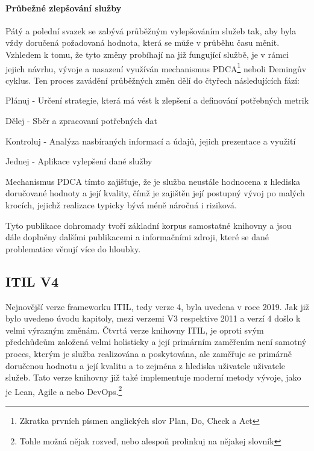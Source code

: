\documentclass[
  digital,     %
  twoside,     %
  lof,         %
  lot,         %
]{fithesis4}
\begin{document}
\paragraph{Průbežné zlepšování služby}
Pátý a polední svazek se zabývá průběžným vylepšováním služeb tak, aby byla vždy doručená požadovaná hodnota, která se může v průběhu času měnit. Vzhledem k tomu, že tyto změny probíhají na již fungující službě, je v rámci jejich návrhu, vývoje a nasazení využíván mechanismus PDCA\footnote{Zkratka prvních písmen anglických slov Plan, Do, Check a Act} neboli Demingův cyklus. Ten proces zavádění průběžných změn dělí do čtyřech následujících fází: \parencite[s.~38]{Matula2017}
\begin{compactitem}
    \item Plánuj - Určení strategie, která má vést k zlepšení a definování potřebných metrik
    \item Dělej - Sběr a zpracovaní potřebných dat
    \item Kontroluj - Analýza nasbíraných informací a údajů, jejich prezentace a využití
    \item Jednej - Aplikace vylepšení dané služby
\end{compactitem}
Mechanismus PDCA tímto zajišťuje, že je služba neustále hodnocena z hlediska doručované hodnoty a její kvality, čímž je zajištěn její postupný vývoj po malých krocích, jejichž realizace typicky bývá méně náročná i riziková. 

Tyto publikace dohromady tvoří základní korpus samostatné knihovny a jsou dále doplněny dalšími publikacemi a informačními zdroji, které se dané problematice věnují více do hloubky. \parencite[s.~8]{Carlidge2007}

\subsection{ITIL V4}
Nejnovější verze frameworku ITIL, tedy verze 4, byla uvedena v roce 2019. Jak již bylo uvedeno úvodu kapitoly, mezi verzemi V3 respektive 2011 a verzí 4 došlo k velmi výrazným změnám. Čtvrtá verze knihovny ITIL, je oproti svým předchůdcům založená velmi holisticky a její primárním zaměřením není samotný proces, kterým je služba realizována a poskytována, ale zaměřuje se primárně doručenou hodnotu a její kvalitu a to zejména z hlediska uživatele uživatele služeb. Tato verze knihovny již také implementuje moderní metody vývoje, jako je Lean, Agile a nebo DevOps.\footnote{Tohle možná nějak rozveď, nebo alespoň prolinkuj na nějakej slovník} \parencite[s.~7]{Cartlidge2020}
\end{document}
